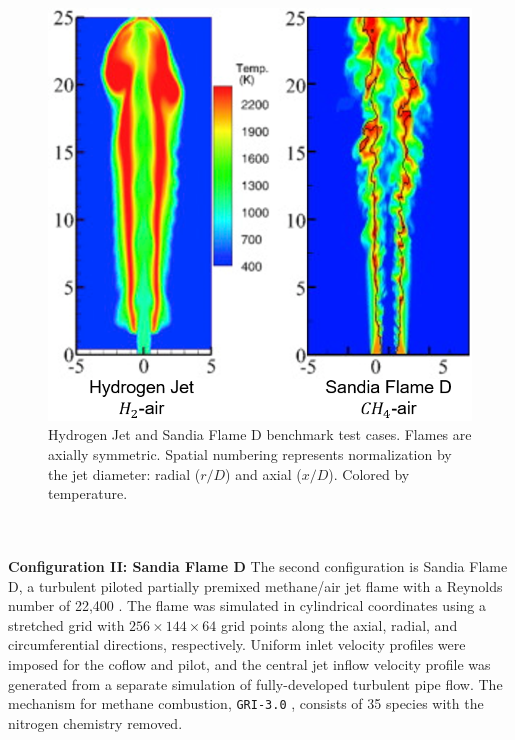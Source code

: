 \documentclass[letterpaper,twocolumn,10pt]{article}
\begin{document}
\begin{figure}[h!]
    \centering
    \includegraphics[width=1.03\linewidth]{Figures/Benchmarks.PNG}
    \caption{Hydrogen Jet and Sandia Flame D benchmark test cases. Flames are axially symmetric. Spatial numbering represents normalization by the jet diameter: radial ($r/D$) and axial ($x/D$). Colored by temperature.}
    \label{fig:Benchmarks}
\end{figure}
\\ \\ \noindent
\textbf{Configuration II: Sandia Flame D}
The second configuration is Sandia Flame D, a turbulent piloted partially premixed methane/air jet flame with a Reynolds number of 22,400 \cite{TNF,BARLOW1998}. The flame was simulated
in cylindrical coordinates using a stretched grid with $256 \times 144 \times 64$ grid points along the axial, radial, and circumferential directions, respectively. Uniform inlet velocity profiles were imposed for the coflow and pilot, and the central jet inflow velocity profile was generated from a separate simulation of fully-developed turbulent pipe flow. The mechanism for methane combustion, \texttt{GRI-3.0} \cite{gri30}, consists of 35 species with the nitrogen chemistry removed.
\end{document}
